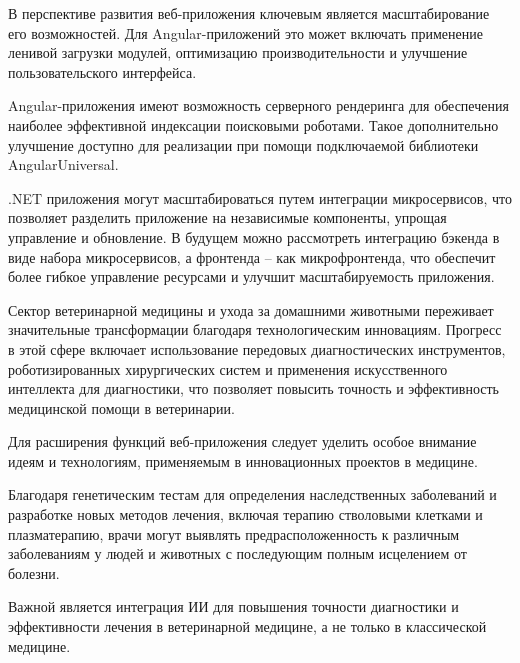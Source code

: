 В перспективе развития веб-приложения ключевым является масштабирование его возможностей. Для Angular-приложений это может включать применение ленивой загрузки модулей, оптимизацию производительности и улучшение пользовательского интерфейса.

Angular-приложения имеют возможность серверного рендеринга для обеспечения наиболее эффективной индексации поисковыми роботами. Такое дополнительно улучшение доступно для реализации при помощи подключаемой библиотеки AngularUniversal. 

.NET приложения могут масштабироваться путем интеграции микросервисов, что позволяет разделить приложение на независимые компоненты, упрощая управление и обновление. В будущем можно рассмотреть интеграцию бэкенда в виде набора микросервисов, а фронтенда – как микрофронтенда, что обеспечит более гибкое управление ресурсами и улучшит масштабируемость приложения.

Сектор ветеринарной медицины и ухода за домашними животными переживает значительные трансформации благодаря технологическим инновациям. Прогресс в этой сфере включает использование передовых диагностических инструментов, роботизированных хирургических систем и применения искусственного интеллекта для диагностики, что позволяет повысить точность и эффективность медицинской помощи в ветеринарии.

Для расширения функций веб-приложения следует уделить особое внимание идеям и технологиям, применяемым в инновационных проектов в медицине.

Благодаря генетическим тестам для определения наследственных заболеваний и разработке новых методов лечения, включая терапию стволовыми клетками и плазматерапию, врачи могут выявлять предрасположенность к различным заболеваниям у людей и животных с последующим полным исцелением от болезни.

Важной является интеграция ИИ для повышения точности диагностики и эффективности лечения в ветеринарной медицине, а не только в классической медицине.
